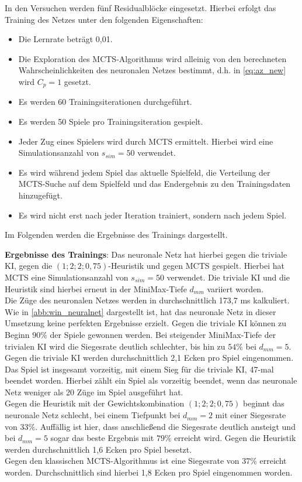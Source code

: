 \documentclass[12pt,a4paper,bibliography=totocnumbered,listof=totocnumbered]{article}
\begin{document}
In den Versuchen werden fünf Residualblöcke eingesetzt. Hierbei erfolgt das Training des Netzes unter den folgenden Eigenschaften:
\begin{itemize}
\item Die Lernrate beträgt 0,01.
\item Die Exploration des MCTS-Algorithmus wird alleinig von den berechneten Wahrscheinlichkeiten des neuronalen Netzes bestimmt, d.h. in \autoref{eq:az_new} wird $C_p=1$ gesetzt.
\item Es werden 60 Trainingsiterationen durchgeführt.
\item Es werden 50 Spiele pro Trainingsiteration gespielt.
\item Jeder Zug eines Spielers wird durch MCTS ermittelt. Hierbei wird eine Simulationsanzahl von $s_{sim}=50$ verwendet.
\item Es wird während jedem Spiel das aktuelle Spielfeld, die Verteilung der MCTS-Suche auf dem Spielfeld und das Endergebnis zu den Trainingsdaten hinzugefügt.
\item Es wird nicht erst nach jeder Iteration trainiert, sondern nach jedem Spiel.
\end{itemize}
Im Folgenden werden die Ergebnisse des Trainings dargestellt.

\textbf{Ergebnisse des Trainings}:
Das neuronale Netz hat hierbei gegen die triviale KI, gegen die $(1;2;2;0,75)$-Heuristik und gegen MCTS gespielt. Hierbei hat MCTS eine Simulationsanzahl von $s_{sim}=50$ verwendet. Die triviale KI und die Heuristik sind hierbei erneut in der MiniMax-Tiefe $d_{mm}$ variiert worden.\\
Die Züge des neuronalen Netzes werden in durchschnittlich 173,7 ms kalkuliert. Wie in \autoref{abb:win_neuralnet} dargestellt ist, hat das neuronale Netz in dieser Umsetzung keine perfekten Ergebnisse erzielt. Gegen die triviale KI können zu Beginn $90\%$ der Spiele gewonnen werden. Bei steigender MiniMax-Tiefe der trivialen KI wird die Siegesrate deutlich schlechter, bis hin zu $54\%$ bei $d_{mm}=5$. Gegen die triviale KI werden durchschnittlich 2,1 Ecken pro Spiel eingenommen. Das Spiel ist insgesamt vorzeitig, mit einem Sieg für die triviale KI, 47-mal beendet worden. Hierbei zählt ein Spiel als vorzeitig beendet, wenn das neuronale Netz weniger als 20 Züge im Spiel ausgeführt hat.\\
Gegen die Heuristik mit der Gewichtskombination $(1;2;2;0,75)$ beginnt das neuronale Netz schlecht, bei einem Tiefpunkt bei $d_{mm} = 2$ mit einer Siegesrate von $33\%$. Auffällig ist hier, dass anschließend die Siegesrate deutlich ansteigt und bei $d_{mm}=5$ sogar das beste Ergebnis mit $79\%$ erreicht wird. Gegen die Heuristik werden durchschnittlich 1,6 Ecken pro Spiel besetzt.\\
Gegen den klassischen MCTS-Algorithmus ist eine Siegesrate von $37\%$ erreicht worden. Durchschnittlich sind hierbei 1,8 Ecken pro Spiel eingenommen worden.\\\\
\end{document}
